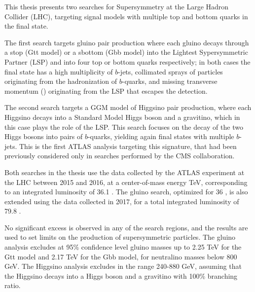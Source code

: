 This thesis presents two searches for Supersymmetry at the Large Hadron Collider (LHC), targeting signal models with multiple top and bottom quarks in the final state.

The first search targets gluino pair production where each gluino decays through a stop
(Gtt model) or a sbottom (Gbb model) into the Lightest Sypersymmetric Partner (LSP) and into four top or bottom quarks respectively;
in both cases the final state has a high multiplicity of $b$-jets, collimated 
sprays of particles originating from the hadronization of $b$-quarks, and 
missing transverse momentum (\met) originating from the LSP  
that escapes the detection. 

The second search targets a GGM model of Higgsino pair production, 
where each Higgsino decays into a Standard Model Higgs boson and 
a gravitino, which in this case plays the role of the LSP. 
This search focuses on the decay of the two Higgs bosons into pairs of $b$-quarks, yielding again final states with multiple $b$-jets.
This is the first ATLAS analysis targeting this signature, that had been 
previously considered only in searches performed by the CMS collaboration.

Both searches in the thesis use the data collected by the ATLAS experiment at the LHC 
between 2015 and 2016, at a center-of-mass energy  \cmtre TeV,
corresponding to an integrated luminosity of 36.1 \ifb.
The gluino search, optimized for 36 \ifb, is also extended using the data collected in 2017, 
for a total integrated luminosity of 79.8 \ifb.

No significant excess is observed in any of the search regions, 
and the results are used to 
set limits on the production of supersymmetric particles. 
The gluino analysis excludes at 95\% confidence level gluino masses up to 2.25 TeV for the Gtt model 
and 2.17 TeV for the Gbb model, for neutralino masses below 800 GeV.
The Higgsino analysis excludes \mhino in the range 240-880 GeV, assuming 
that the Higgsino decays into a Higgs boson and a gravitino with 100\% branching ratio. 

